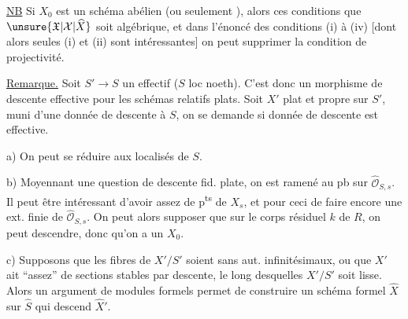 \uline{NB} Si $X_0$ est un schéma abélien  (ou seulement
), alors ces conditions   que
$\unsure{\mathfrak X|\mathcal X|\widehat X}$ soit algébrique, et dans l'énoncé des conditions
(i) à (iv) [dont alors seules (i) et (ii) sont intéressantes]
on peut supprimer la condition de projectivité.

\uline{Remarque.} Soit $S'\to S$ un  
effectif ($S$ loc noeth). C'est donc un morphisme
de descente effective pour les schémas relatifs plats.
Soit $X'$ plat et propre sur $S'$, muni d'une donnée de
descente à $S$, on  se demande si donnée
de descente est effective.


a) On peut se réduire aux localisés  de $S$.

b) Moyennant une question de descente  fid.
plate, on est ramené au pb sur $\widehat{\mathcal O}_{S,s}$. Il
peut être intéressant d'avoir  assez de p\textsuperscript{ts}
de $X_s$, et pour ceci de faire encore une ext. finie
  de $\widehat{\mathcal O}_{S,s}$. On peut alors supposer que
 sur le corps résiduel $k$ de $R$, on peut
descendre, donc qu'on a un $X_0$.

c) Supposons  que les fibres de $X'/S'$ soient
sans aut. infinitésimaux, ou que $X'$ 
ait  ``assez'' de sections  
stables par descente, le long desquelles $X'/S'$ soit
lisse. Alors  un argument de modules
formels permet de construire un schéma formel
$\widehat X$ sur $\widehat S$ qui descend $\widehat X'$.

